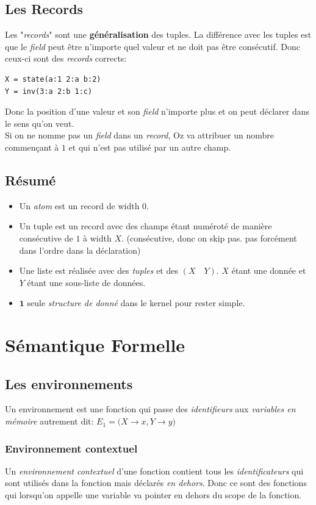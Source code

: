 \documentclass{report}
\begin{document}
\subsection{Les Records} \label{record}
Les "\textit{records}" sont une \textbf{généralisation} des tuples. La différence avec les tuples est que le \textit{field} peut être n'importe quel valeur et ne doit pas être consécutif. Donc ceux-ci sont des \textit{records} corrects:
\begin{lstlisting}
X = state(a:1 2:a b:2)
Y = inv(3:a 2:b 1:c)

\end{lstlisting}
Donc la position d'une valeur et son \textit{field} n'importe plus et on peut déclarer dans le sens qu'on veut.\\
Si on ne nomme pas un \textit{field} dans un \textit{record}, Oz va attribuer un nombre commençant à $1$ et qui n'est pas utilisé par un autre champ.\\
\subsection{Résumé}
\begin{itemize}
\item Un \textit{atom} est un record de width $0$.
\item Un tuple est un record avec des champs étant numéroté de manière consécutive de $1$ à width $X$. (consécutive, donc on skip pas. pas forcément dans l'ordre dans la déclaration)
\item Une liste est réalisée avec des \textit{tuples} et des $(X \quad Y)$. $X$ étant une donnée et $Y$ étant une sous-liste de données.
\item $\textbf{1}$ seule \textit{structure de donné} dans le kernel pour rester simple.
\end{itemize}

\section{Sémantique Formelle}
\subsection{Les environnements}
Un environnement est une fonction qui passe des \textit{identifieurs} aux \textit{variables en mémoire} autrement dit: $E_1 = ({X \rightarrow x, Y \rightarrow y)}$

\subsubsection{Environnement contextuel}
Un \textit{environnement contextuel} d'une fonction contient tous les \textit{identificateurs} qui sont utilisés dans la fonction mais déclarés \textit{en dehors}. Donc ce sont des fonctions qui lorsqu'on appelle une variable va pointer en dehors du scope de la fonction.
\end{document}
